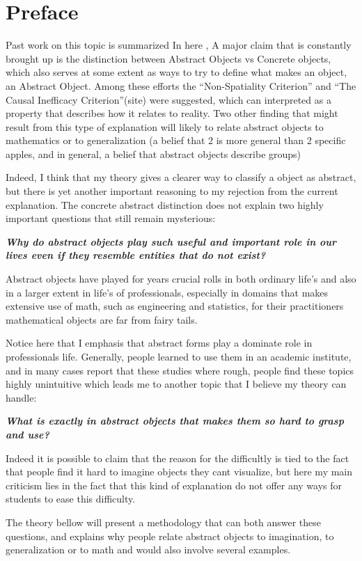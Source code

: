 \documentclass[10pt]{article}
\begin{document}
\newpage


\section*{Preface}
Past work on this topic is summarized In here \cite{standford} , A major claim that is constantly  brought up is the distinction between Abstract Objects vs Concrete objects, which also serves at some extent as ways to try to define what makes an object, an Abstract Object. Among these efforts the “Non-Spatiality Criterion” and “The Causal Inefficacy Criterion”(site)  were suggested, which can interpreted as a property that describes how it relates to reality. Two other finding that might result from this type of explanation will likely to relate abstract objects to mathematics or to generalization (a belief that 2 is more general than 2 specific apples, and in general, a belief that abstract objects describe groups)\par

Indeed, I think that my theory gives a clearer way to classify a object as abstract,  but there is yet another important reasoning to my rejection from the current explanation. The concrete abstract distinction does not explain two highly important questions that still remain mysterious: \par
\textbf{\textit{Why do abstract objects play such useful and important role in our lives even if they resemble entities that do not exist?}}\par
Abstract objects have played for years crucial rolls in both ordinary life's and also in a larger extent in life's of professionals, especially in domains that makes extensive use of math, such as engineering and statistics, for their practitioners mathematical objects are far from fairy tails.
\par
Notice here that I emphasis that  abstract forms play a dominate role in professionals life. Generally, people learned to use them in an academic institute, and in many cases report that these studies where rough, people find these topics highly unintuitive which leads me to another topic that I believe my theory can handle:\par

\textbf{\textit{What is exactly in abstract objects that makes them so hard to grasp and use?}}
\par
Indeed it is possible to claim that the reason for the difficultly is tied to the fact that people find it hard to imagine objects they cant visualize, but here my main criticism lies in the fact that this kind of explanation do not offer any ways for students to ease this difficulty.\par
The theory bellow will present a methodology that can both answer these questions, and explains why people relate abstract objects to imagination, to generalization or to math and would also involve several examples.
\newpage 
\end{document}
